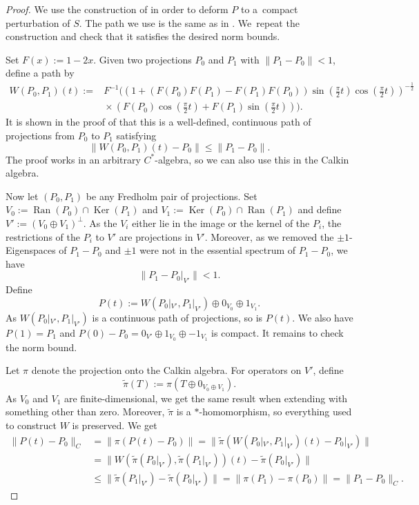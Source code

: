 \documentclass[pdftex]{sigma}
\numberwithin{equation}{section}
\DeclareMathOperator{\Ran}{Ran}
\DeclareMathOperator{\Ker}{Ker}
\begin{document}
	\begin{proof}
		We use the construction of \cite[Propositions 5.3.18 and 5.3.19]{DSW} in order to deform $P$ to a~compact perturbation of $S$. The path we use is the same as in \cite[Proposition~5.3.19]{DSW}. We~repeat the construction and check that it satisfies the desired norm bounds.
		
		Set $F(x):=1-2x$. Given two projections $P_0$ and $P_1$ with $\|P_1-P_0\|<1$, define a path by
		\begin{align*}
			W(P_0,P_1)(t):={}&F^{-1}\biggl( \left(1+ (F(P_0)F(P_1)-F(P_1)F(P_0))\sin\left(\frac{\pi}{2}t\right)\cos\left(\frac{\pi}{2}t\right)\right)^{-\frac{1}{2}} \\
			& {}\times \left(F(P_0)\cos\left(\frac{\pi}{2}t\right)+F(P_1)\sin\left(\frac{\pi}{2}t\right)\right)\biggr).
		\end{align*}
		It is shown in the proof of \cite[Proposition~5.3.18]{DSW} that this is a well-defined, continuous path of projections from $P_0$ to $P_1$ satisfying
		\[\|W(P_0,P_1)(t)-P_0\|\leq\|P_1-P_0\|.\]
		The proof works in an arbitrary $C^*$-algebra, so we can also use this in the Calkin algebra.
		
		Now let $(P_0,P_1)$ be any Fredholm pair of projections.
		Set $V_0:=\Ran(P_0)\cap\Ker(P_1)$ and $V_1:=\Ker(P_0)\cap\Ran(P_1)$ and define $V':=(V_0\oplus V_1)^\bot$. As the $V_i$ either lie in the image or the kernel of the $P_i$, the restrictions of the $P_i$ to $V'$ are projections in $V'$. Moreover, as we removed the $\pm1$-Eigenspaces of $P_1-P_0$ and $\pm1$ were not in the essential spectrum of $P_1-P_0$, we have
		\[\|P_1-P_0|_{V'}\|<1.\]
		Define
		\[P(t):= W(P_0|_{V'},P_1|_{V'})\oplus 0_{V_0}\oplus 1_{V_1}.\]
		As $W(P_0|_{V'},P_1|_{V'})$ is a continuous path of projections, so is $P(t)$. We also have $P(1)=P_1$ and $P(0)-P_0=0_{V'}\oplus 1_{V_0}\oplus -1_{V_1}$ is compact. It remains to check the norm bound.
		
		Let $\pi$ denote the projection onto the Calkin algebra. For operators on $V'$, define \[\tilde\pi(T):=\pi(T\oplus 0_{V_0\oplus V_1}).\] As $V_0$ and $V_1$ are finite-dimensional, we get the same result when extending with something other than zero. Moreover, $\tilde\pi$ is a $*$-homomorphism, so everything used to construct $W$ is preserved. We get
		\begin{align*}
			\|P(t)-P_0\|_C&=\|\pi(P(t)-P_0)\|
			 =\|\tilde\pi (W(P_0|_{V'},P_1|_{V'})(t)-P_0|_{V'})\| \\
			 &=\|W(\tilde\pi(P_0|_{V'}),\tilde\pi(P_1|_{V'}))(t)-\tilde\pi(P_0|_{V'})\|\\
			&\leq \|\tilde\pi(P_1|_{V'})-\tilde\pi(P_0|_{V'})\|
			 =\|\pi(P_1)-\pi(P_0)\|
			 =\|P_1-P_0\|_C. \tag*{\qed}
        \end{align*}
\renewcommand{\qed}{}
\end{proof}
\end{document}
